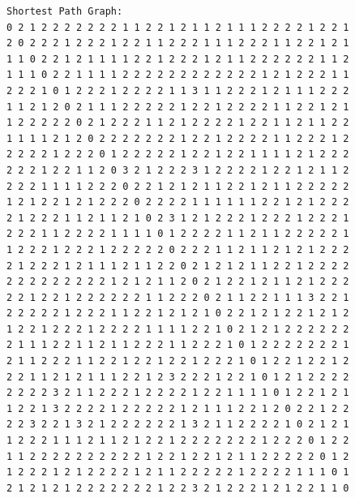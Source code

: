 \documentclass[11pt]{article}
\begin{document}
\begin{lstlisting}
Shortest Path Graph:
0 2 1 2 2 2 2 2 2 2 1 1 2 2 1 2 1 1 2 1 1 1 2 2 2 2 1 2 2 1
2 0 2 2 2 1 2 2 2 1 2 2 1 1 2 2 2 1 1 1 2 2 2 1 1 2 2 1 2 1
1 1 0 2 2 1 2 1 1 1 1 2 2 1 2 2 2 1 2 1 1 2 2 2 2 2 2 1 1 2
1 1 1 0 2 2 1 1 1 1 2 2 2 2 2 2 2 2 2 2 2 2 1 2 1 2 2 2 1 1
2 2 2 1 0 1 2 2 2 1 2 2 2 2 1 1 3 1 1 2 2 2 1 2 1 1 1 2 2 2
1 1 2 1 2 0 2 1 1 1 2 2 2 2 2 1 2 2 1 2 2 2 2 1 1 2 2 1 2 1
1 2 2 2 2 2 0 2 1 2 2 2 1 1 2 1 2 2 2 2 1 2 2 1 1 2 1 1 2 2
1 1 1 1 2 1 2 0 2 2 2 2 2 2 2 1 2 2 1 2 2 2 2 1 1 2 2 2 1 2
2 2 2 2 1 2 2 2 0 1 2 2 2 2 2 1 2 2 1 2 2 1 1 1 1 2 1 2 2 2
2 2 2 1 2 2 1 1 2 0 3 2 1 2 2 2 3 1 2 2 2 2 1 2 2 1 2 1 1 2
2 2 2 1 1 1 1 2 2 2 0 2 2 1 2 1 2 1 1 2 2 1 2 1 1 2 2 2 2 2
1 2 1 2 2 1 2 1 2 2 2 0 2 2 2 2 1 1 1 1 1 1 2 2 1 2 1 2 2 2
2 1 2 2 2 1 1 2 1 1 2 1 0 2 3 1 2 1 2 2 2 1 2 2 2 1 2 2 2 1
2 2 2 1 1 2 2 2 2 1 1 1 1 0 1 2 2 2 2 1 1 2 1 1 2 2 2 2 2 1
1 2 2 2 1 2 2 2 1 2 2 2 2 2 0 2 2 2 1 1 2 1 1 2 1 2 1 2 2 2
2 1 2 2 2 1 2 1 1 1 2 1 1 2 2 0 2 1 2 1 2 1 1 2 2 1 2 2 2 2
2 2 2 2 2 2 2 2 2 1 2 1 2 1 1 2 0 2 1 2 2 1 2 1 1 2 1 2 2 2
2 2 1 2 2 1 2 2 2 2 2 2 1 1 2 2 2 0 2 1 1 2 2 1 1 1 3 2 2 1
2 2 2 2 2 1 2 2 2 1 1 2 2 1 2 1 2 1 0 2 2 1 2 1 2 2 1 2 1 2
1 2 2 1 2 2 2 1 2 2 2 2 1 1 1 1 2 2 1 0 2 1 2 1 2 2 2 2 2 2
2 1 1 1 2 2 1 1 2 1 1 2 2 2 1 1 2 2 2 1 0 1 2 2 2 2 2 2 2 1
2 1 1 2 2 2 1 1 2 2 1 2 2 1 2 2 1 2 2 2 1 0 1 2 2 1 2 2 1 2
2 2 1 1 2 1 2 1 1 1 2 2 1 2 3 2 2 2 1 2 2 1 0 1 2 1 2 2 2 2
2 2 2 2 3 2 1 1 2 2 2 1 2 2 2 2 1 2 2 1 1 1 1 0 1 2 2 1 2 1
1 2 2 1 3 2 2 2 2 1 2 2 2 2 2 1 2 1 1 1 2 2 1 2 0 2 2 1 2 2
2 2 3 2 2 1 3 2 1 2 2 2 2 2 2 1 3 2 1 1 2 2 2 2 1 0 2 1 2 1
1 2 2 2 1 1 1 2 1 1 2 1 2 2 1 2 2 2 2 2 2 2 1 2 2 2 0 1 2 2
1 1 2 2 2 2 2 2 2 2 2 2 1 2 2 1 2 2 1 2 1 1 2 2 2 2 2 0 1 2
1 2 2 2 1 2 1 2 2 2 2 1 2 1 1 2 2 2 2 2 1 2 2 2 2 1 1 1 0 1
2 1 2 1 2 1 2 2 2 2 2 2 2 1 2 2 3 2 1 2 2 2 1 2 1 2 2 1 1 0


\end{lstlisting}
\end{document}
